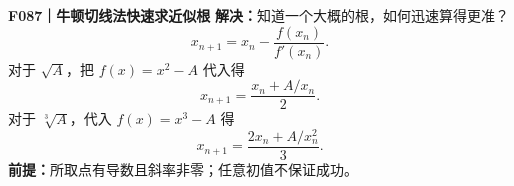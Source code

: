 \textbf{F087｜牛顿切线法快速求近似根}
\textbf{解决：}知道一个大概的根，如何迅速算得更准？
\[\boxed{x_{n+1}=x_n-\frac{f(x_n)}{f'(x_n)}}.\]
对于 $\sqrt A$，把 $f(x)=x^2-A$ 代入得
\[\boxed{x_{n+1}=\frac{x_n+A/x_n}{2}}.\]
对于 $\sqrt[3]A$，代入 $f(x)=x^3-A$ 得
\[\boxed{x_{n+1}=\frac{2x_n+A/x_n^2}{3}}.\]
\textbf{前提：}所取点有导数且斜率非零；任意初值不保证成功。
